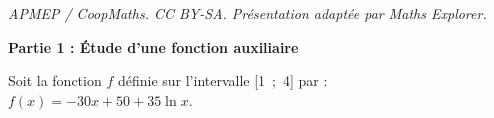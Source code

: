\documentclass[10pt]{article}
\begin{document}
\noindent\textit{APMEP / CoopMaths. CC BY-SA. Présentation adaptée par Maths Explorer.}\par\medskip
\medskip













\begin{center}\textbf{Partie 1 : Étude d'une fonction auxiliaire}\end{center}

\begin{center}
Soit la fonction $f$ définie sur l'intervalle [1~;~4] par : 
$f(x) = - 30x + 50 + 35\ln x.$
\end{center}
\end{document}
